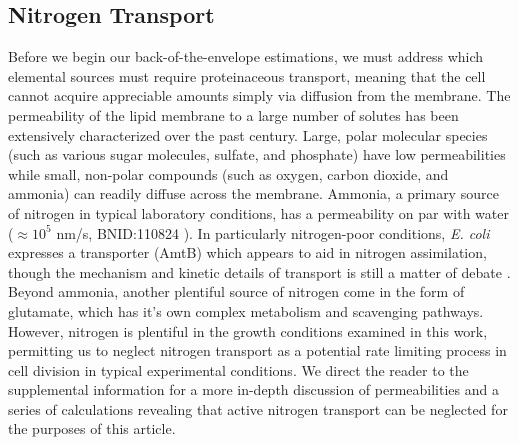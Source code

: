 \subsection{Nitrogen Transport}
Before we begin our back-of-the-envelope estimations, we must address which
elemental sources must require proteinaceous transport, meaning that the cell
cannot acquire appreciable amounts simply via diffusion from the membrane. 
The permeability of the lipid membrane to a large number of solutes has been
extensively characterized over the past century. Large, polar 
molecular species (such as various sugar molecules, sulfate, and phosphate) have
low permeabilities  while small, non-polar compounds (such as oxygen, carbon
dioxide, and ammonia) can readily diffuse across the
membrane. Ammonia, a primary source of nitrogen in typical laboratory
conditions, has a permeability on par with water ($\approx 10^5$ nm/s,
BNID:110824 \cite{milo2010}). In particularly nitrogen-poor
conditions, \textit{E. coli} expresses a transporter (AmtB) which appears to aid in
nitrogen assimilation, though the mechanism and kinetic details of transport
is still a matter of debate \citep{heeswijk2013a, khademi2004}. Beyond ammonia,
another plentiful source of nitrogen come in the form of glutamate, which has it's
own complex metabolism and scavenging pathways. However, nitrogen is plentiful
in the growth conditions examined in this work, permitting us to neglect
nitrogen transport as a potential rate limiting process in cell division in
typical experimental conditions. We direct the reader to the supplemental
information for a more in-depth discussion of permeabilities and a series of
calculations revealing that active nitrogen transport can be neglected for the
purposes of this article. 


